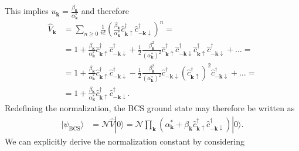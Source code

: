 \documentclass[english, parskip=full]{scrartcl}
\newcommand{\kla}{}
\newcommand{\tecxt}{}
\newcommand{\Ket}{}
\begin{document}
This implies $u_{\mathbf{k}} = \frac{\beta_{\mathbf{k}}}{\alpha_{\mathbf{k}}^\ast}$ and therefore
\begin{align}
\hat{V}_{\mathbf{k}} &= \sum_{n\ge 0} \frac{1}{n!} \kla\left( \frac{\beta_{\mathbf{k}}}{\alpha_{\mathbf{k}}^\ast} \hat{c}_{\mathbf{k}\uparrow}^\dagger \hat{c}_{-\mathbf{k}\downarrow}^\dagger \right)^n = \\
&= 1 + \frac{\beta_{\mathbf{k}}}{\alpha_{\mathbf{k}}^\ast} \hat{c}_{\mathbf{k}\uparrow}^\dagger \hat{c}_{-\mathbf{k}\downarrow}^\dagger + \frac{1}{2} \frac{\beta_{\mathbf{k}}^2}{(\alpha_{\mathbf{k}}^\ast)^2} \hat{c}_{\mathbf{k}\uparrow}^\dagger \hat{c}_{-\mathbf{k}\downarrow}^\dagger \hat{c}_{\mathbf{k}\uparrow}^\dagger \hat{c}_{-\mathbf{k}\downarrow}^\dagger + \dots = \\
&= 1 + \frac{\beta_{\mathbf{k}}}{\alpha_{\mathbf{k}}^\ast} \hat{c}_{\mathbf{k}\uparrow}^\dagger \hat{c}_{-\mathbf{k}\downarrow}^\dagger - \frac{1}{2} \frac{\beta_{\mathbf{k}}^2}{(\alpha_{\mathbf{k}}^\ast)^2} \hat{c}_{-\mathbf{k}\downarrow}^\dagger \kla\left( \hat{c}_{\mathbf{k}\uparrow}^\dagger \right)^2 \hat{c}_{-\mathbf{k}\downarrow}^\dagger + \dots = \\
&= 1 + \frac{\beta_{\mathbf{k}}}{\alpha_{\mathbf{k}}^\ast} \hat{c}_{\mathbf{k}\uparrow}^\dagger \hat{c}_{-\mathbf{k}\downarrow}^\dagger.
\end{align}
Redefining the normalization, the BCS ground state may therefore be written as
\begin{align}
\Ket | \psi_\tecxt\text{BCS} \rangle &= \mathcal{N} \hat{V}\Ket | 0 \rangle = \mathcal{N} \prod_{\mathbf{k}} \kla\left( \alpha_{\mathbf{k}}^\ast + \beta_{\mathbf{k}} \hat{c}_{\mathbf{k}\uparrow}^\dagger \hat{c}_{-\mathbf{k}\downarrow}^\dagger  \right) \Ket | 0 \rangle.
\end{align}
We can explicitly derive the normalization constant by considering 
\end{document}
